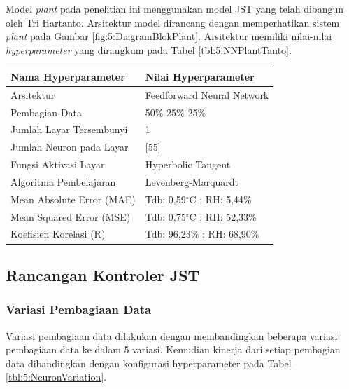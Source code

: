 \documentclass[a4paper,10pt]{article}
\makeatletter
\newenvironment{body}{\begin{multicols}{2}}{\end{multicols}}
\renewenvironment{table}
{\def\@captype{table}%
	\captionsetup{format=plain,labelsep=newline,font=footnotesize,textfont=sc,justification=centering}%
	\fontsize{8}{8}\selectfont
}
{}
\makeatother
\begin{document}
\begin{body}
		Model \textit{plant} pada penelitian ini menggunakan model JST yang telah dibangun oleh Tri Hartanto\cite{skripsiTanto}. Arsitektur model dirancang dengan memperhatikan sistem \textit{plant} pada Gambar \ref{fig:5:DiagramBlokPlant}. Arsitektur memiliki nilai-nilai \textit{hyperparameter} yang dirangkum pada Tabel \ref{tbl:5:NNPlantTanto}.
		
		\begin{table}
			\caption{Tabel Rancangan Model Plant JST\cite{skripsiTanto}}
			\label{tbl:5:NNPlantTanto}
			\centering
			\begin{tabularx}{\linewidth}{ll}\toprule
				\textbf{Nama Hyperparameter} & \textbf{Nilai Hyperparameter} \\ \toprule
				Arsitektur & Feedforward Neural Network \\ \midrule
				Pembagian Data & 50\% 25\% 25\% \\ \midrule 
				Jumlah Layar Tersembunyi & 1 \\ \midrule
				Jumlah Neuron pada Layar & [55] \\ \midrule
				Fungsi Aktivasi Layar & Hyperbolic Tangent \\ \midrule
				Algoritma Pembelajaran & Levenberg-Marquardt \\ \midrule
				Mean Absolute Error (MAE) & Tdb: 0,59$^\circ$C ; RH: 5,44\% \\ \midrule
				Mean Squared Error (MSE) & Tdb: 0,75$^\circ$C ; RH: 52,33\% \\ \midrule
				Koefisien Korelasi (R) & Tdb: 96,23\% ; RH: 68,90\% \\ \bottomrule
			\end{tabularx}
		\end{table}
		
		\subsection{Rancangan Kontroler JST}
		\subsubsection{Variasi Pembagiaan Data}
		
		Variasi pembagiaan data dilakukan dengan membandingkan beberapa variasi pembagiaan data ke dalam 5 variasi. Kemudian kinerja dari setiap pembagian data dibandingkan dengan konfigurasi hyperparameter pada Tabel \ref{tbl:5:NeuronVariation}.
		

\end{body}
\end{document}
